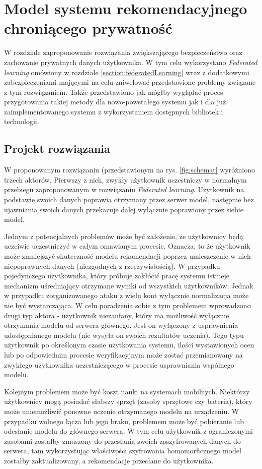 
\chapter{Model systemu rekomendacyjnego chroniącego prywatność}

W rozdziale zaproponowanie rozwiązania zwiększającego bezpieczeństwo oraz zachowanie prywatnych danych użytkownika. W tym celu wykorzystano \textit{Federated learning} omówiony w rozdziale \ref{section:federatedLearning} wraz z dodatkowymi zabezpieczeniami mającymi na celu zniwelować przedstawione problemy związane z tym rozwiązaniem. Także przedstawiono jak mógłby wyglądać proces przygotowania takiej metody dla nowo-powstałego systemu jak i dla już zaimplementowanego systemu z wykorzystaniem dostępnych bibliotek i technologii.

\section{Projekt rozwiązania}

W proponowanym rozwiązaniu (przedstawionym na rys. \ref{fig:schemat} wyróżniono trzech aktorów. Pierwszy z nich, zwykły użytkownik uczestniczy w normalnym przebiegu zaproponowanym w rozwiązaniu \textit{Federated learning}. Użytkownik na podstawie swoich danych poprawia otrzymany przez serwer model, następnie bez ujawniania swoich danych przekazuje dalej wyłącznie poprawiony przez siebie model.

Jednym z potencjalnych problemów może być założenie, że użytkownicy będą uczciwie uczestniczyć w całym omawianym procesie. Oznacza, to że użytkownik może zmniejszyć skuteczność modelu rekomendacji poprzez umieszczenie w nich niepoprawnych danych (niezgodnych z rzeczywistością). W przypadku pojedynczego użytkownika, który próbuje zakłócić pracę systemu istnieje mechanizm uśredniający otrzymane wyniki od wszystkich użytkowników. Jednak w przypadku zorganizowanego ataku z wielu kont wyłącznie normalizacja może nie być wystarczająca. W celu poradzenia sobie z tym problemem wprowadzono drugi typ aktora - użytkownik niezaufany, który ma możliwość wyłącznie otrzymania modelu od serwera głównego. Jest on wyłączony z usprawnienia udostępnianego modelu (nie wysyła on swoich rezultatów uczenia). Tego typu użytkownik po określonym czasie użytkowania systemu, ilości wystawionych ocen lub po odpowiednim procesie weryfikacyjnym może zostać przemianowany na zwykłego użytkownika uczestniczącego w procesie usprawniania wspólnego modelu.

Kolejnym problemem może być koszt nauki na systemach mobilnych. Niektórzy użytkownicy mogą posiadać słabszy sprzęt (zasoby sprzętowe czy bateria), który może uniemożliwić ponowne uczenie otrzymanego modelu na urządzeniu. W przypadku wolnego łącza lub jego braku, problemem może być pobieranie lub odesłanie modelu do głównego serwera. W tym celu użytkownik z ograniczonymi zasobami zostałby zmuszony do przesłania swoich zaszyfrowanych danych do serwera, tam wykorzystując właściwości szyfrowania homomorficznego model zostałby zaktualizowany, a rekomendacje przesłane do użytkownika.

